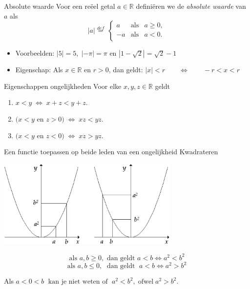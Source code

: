 \documentclass[handout]{beamer}
\author{Annouk Van Vlierden}
\date{2018-2019}
\newcommand{\RR}{\ensuremath{\mathbb{R}}}
\begin{document}
\begin{frame}{Absolute waarde}
Voor een re\"eel getal
$a\in \RR$ defini\"eren we de \emph{ absolute waarde} van $a$
als \\$$|a|\overset{def}{=}\displaystyle\ \left\{\begin{array}{rll  } a & \mbox{als}& a \geqslant 0, \\
-a & \mbox{als} & a<0.\\
\end{array}\right.$$
\begin{itemize}
	\item Voorbeelden: $|5|=5,\; |-\pi|=\pi$ en $|1-\sqrt{2}|=\sqrt{2}-1$
	\item Eigenschap: Als $x \in \RR$ en $r>0 $, dan geldt: $|x|<r\qquad \Leftrightarrow
\qquad -r<x<r$
\end{itemize}
\end{frame}
\begin{frame}{Eigenschappen ongelijkheden}
 Voor elke $x,y,z \in\RR $ geldt
\begin{enumerate}
\item $x< y \;\Leftrightarrow \;x+z< y+z$.
\item $(x<y $ en $ \displaystyle z>
0)\; \Leftrightarrow \; xz< yz$.
\item $(x< y $ en $ \displaystyle z<0)\; \Leftrightarrow \; xz>
yz$.
\end{enumerate}

\end{frame}

\begin{frame}{Een functie toepassen op beide leden van een
ongelijkheid}
Kwadrateren
\begin{center}

\includegraphics[width=9cm]{parabool2bis.ps}\end{center}

$$\mbox{als }a,b \geqslant 0, \mbox{ dan geldt } a<b\Leftrightarrow
a^2<b^2$$
$$\mbox{als }a,b \leqslant 0, \;\mbox{ dan
geldt } \;a<b\Leftrightarrow a^2>b^2$$

Als $a<0<b \;\mbox{ kan je niet weten of }\;a^2<b^2,\; \mbox{ofwel}
\;a^2>b^2$.
\end{frame}
\end{document}
